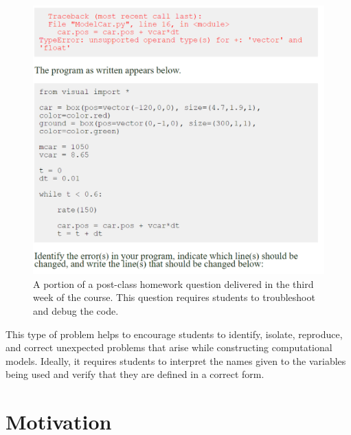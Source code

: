\documentclass{msuphddissertation}
\begin{document}
\begin{doublespace}
\begin{figure}[ht]\centering
\includegraphics[scale=0.50]{images/CH3PostClassHomework.pdf}
\caption{A portion of a post-class homework question delivered in the third week of the course.  This question requires students to troubleshoot and debug the code.}\label{CH3:PostClassHomework}
\end{figure}

This type of problem helps to encourage students to identify, isolate, reproduce, and correct unexpected problems that arise while constructing computational models.  Ideally, it requires students to interpret the names given to the variables being used and verify that they are defined in a correct form.



\chapter{Motivation}\label{CH4:Motivation}


\end{doublespace}
\end{document}
